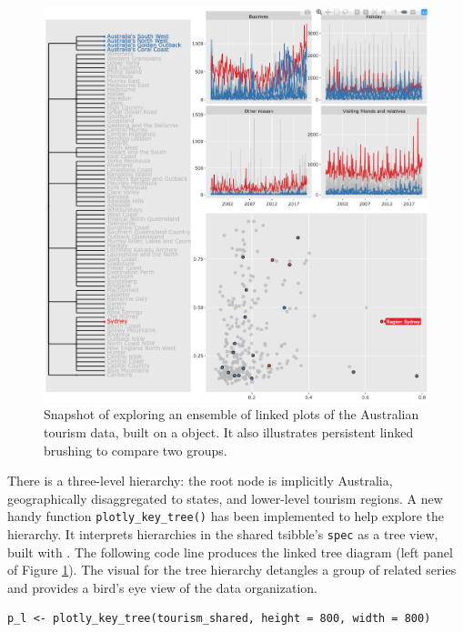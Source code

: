 \begin{figure}

{\centering \includegraphics[width=\textwidth]{img/tourism-linking} 

}

\caption{Snapshot of exploring an ensemble of linked plots of the Australian tourism data, built on a  object. It also illustrates persistent linked brushing to compare two groups.}\label{fig:tourism-linking-fig}
\end{figure}

\noindent There is a three-level hierarchy: the root node is implicitly Australia, geographically disaggregated to states, and lower-level tourism regions. A new handy function \texttt{plotly\_key\_tree()} has been implemented to help explore the hierarchy. It interprets hierarchies in the shared tsibble's \texttt{spec} as a tree view, built with . The following code line produces the linked tree diagram (left panel of Figure \ref{fig:tourism-linking-fig}). The visual for the tree hierarchy detangles a group of related series and provides a bird's eye view of the data organization.

\begin{verbatim}
p_l <- plotly_key_tree(tourism_shared, height = 800, width = 800)
\end{verbatim}

